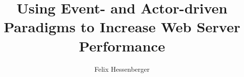\documentclass[master, english]{hgbthesis}
\begin{document}
\title{Using Event- and Actor-driven Paradigms to Increase Web Server Performance}

\author{Felix Hessenberger}

\frontmatter
\maketitle
\tableofcontents 
	
			

		

\mainmatter	












 
\appendix

\end{document}

